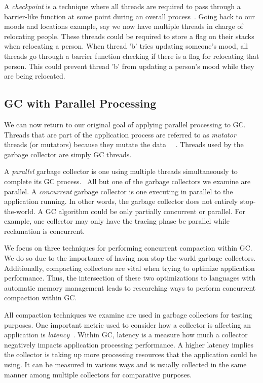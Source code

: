 \documentclass{sig-alternate}
\begin{document}
A \emph{checkpoint} is a technique
where all threads are required to pass through a barrier-like function at some point
during an overall process~\cite{Tene:C4}. Going back to our moods and locations example, say we
now have multiple threads in charge of relocating people. These threads
could be required to store a flag on their stacks when relocating a person.
When thread 'b' tries updating someone's mood, all threads go through
a barrier function checking if there is a flag for relocating that person. This
could prevent thread 'b' from updating a person's mood while they are being relocated.


\subsection{GC with Parallel Processing}
\label{sec:parallelProcessingGarbageCollection}

We can now return to our original goal of applying parallel processing to GC.
Threads that are part of the application process are referred to as \emph{mutator}
threads (or mutators) because they mutate the data~\cite{Tene:C4}~\cite{Iyengar:Collie}
\cite{Osterlund:FPP}. Threads used by the garbage collector are simply GC threads.

A \emph{parallel} garbage collector is one using
multiple threads simultaneously to complete its GC process.~\cite{Puffitsch:background}
All but one of the garbage collectors we examine are parallel. A \emph{concurrent} garbage
collector is one executing in parallel to the application running. In other 
words, the garbage collector does not entirely stop-the-world. A GC algorithm
could be only partially concurrent or parallel. For example, one collector may
only have the tracing phase be parallel while reclamation is concurrent.

We focus on three techniques for performing
concurrent compaction within GC. We do so due to the importance 
of having non-stop-the-world garbage collectors. Additionally, compacting
collectors are vital when trying to optimize application performance. Thus,
the intersection of these two optimizations to languages with automatic memory management leads
to researching ways to perform concurrent compaction within GC.

All compaction techniques we examine are used in garbage
collectors for testing purposes. One important metric used to consider
how a collector is affecting an application is \emph{latency}~\cite{Lindblom:2011}.
Within GC, latency is a measure how much a collector negatively impacts
application processing performance. A higher latency implies the collector
is taking up more processing resources that the application could be using. It 
can be measured in various ways and is usually collected in the same manner
among multiple collectors for comparative purposes.
\end{document}
